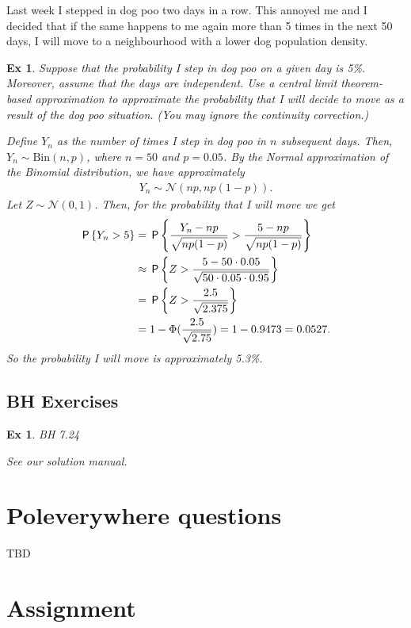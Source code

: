 \documentclass[a4paper,11pt]{article}
\newtheorem{exercise}[theorem]{Ex}
\begin{document}
Last week I stepped in dog poo two days in a row. This annoyed me and I decided that if the same happens to me again more than 5 times in the next 50 days, I will move to a neighbourhood with a lower dog population density.

\begin{exercise}
Suppose that the probability I step in dog poo on a given day is 5\%. Moreover, assume that the days are independent. Use a central limit theorem-based approximation to approximate the probability that I will decide to move as a result of the dog poo situation. (You may ignore the continuity correction.)
\begin{solution}
Define $Y_n$ as the number of times I step in dog poo in $n$ subsequent days. Then, $Y_n \sim \text{Bin}(n, p)$, where $n=50$ and $p = 0.05$. By the Normal approximation of the Binomial distribution, we have approximately
\begin{align}
    Y_n \sim \mathcal{N}(np, np(1-p)).
\end{align}
Let $Z \sim \mathcal{N}(0,1)$. Then, for the probability that I will move we get
\begin{align}
    \P{Y_n > 5} &= \P{\frac{Y_n - np}{\sqrt{np(1-p)}} > \frac{5 - np}{\sqrt{np(1-p)}} } \\
    &\approx \P{Z > \frac{5 - 50\cdot 0.05}{\sqrt{50 \cdot 0.05 \cdot 0.95}} } \\
    &= \P{Z > \frac{2.5}{\sqrt{2.375}} } \\
    &= 1 - \Phi(\frac{2.5}{\sqrt{2.75}}) =  1 - 0.9473 = 0.0527.
\end{align}
So the probability I will move is approximately 5.3\%.
\end{solution}
\end{exercise}


\subsection{BH Exercises}
\label{sec:bh-exercises-1}


\begin{exercise}
BH 7.24
\begin{solution}
See our solution manual.
\end{solution}
\end{exercise}



\section{Poleverywhere questions}
\label{sec:polev-quest}


TBD


\section{Assignment}
\label{sec:assignment}



\end{document}

